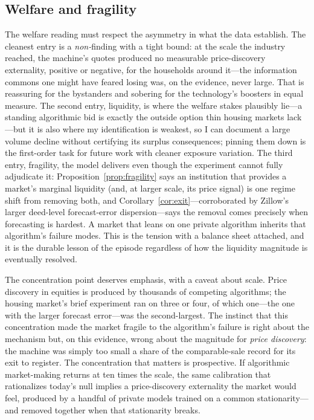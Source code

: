 \documentclass[12pt, letterpaper]{article}
\theoremstyle{remark}
\begin{document}
\subsection{Welfare and fragility}\label{sec:interp-welfare}

The welfare reading must respect the asymmetry in what the data establish. The cleanest entry is a \emph{non-}finding with a tight bound: at the scale the industry reached, the machine's quotes produced no measurable price-discovery externality, positive or negative, for the households around it---the information commons one might have feared losing was, on the evidence, never large. That is reassuring for the bystanders and sobering for the technology's boosters in equal measure. The second entry, liquidity, is where the welfare stakes plausibly lie---a standing algorithmic bid is exactly the outside option thin housing markets lack---but it is also where my identification is weakest, so I can document a large volume decline without certifying its surplus consequences; pinning them down is the first-order task for future work with cleaner exposure variation. The third entry, fragility, the model delivers even though the experiment cannot fully adjudicate it: Proposition~\ref{prop:fragility} says an institution that provides a market's marginal liquidity (and, at larger scale, its price signal) is one regime shift from removing both, and Corollary~\ref{cor:exit}---corroborated by Zillow's larger deed-level forecast-error dispersion---says the removal comes precisely when forecasting is hardest. A market that leans on one private algorithm inherits that algorithm's failure modes. This is the \citet{grossman1980impossibility} tension with a balance sheet attached, and it is the durable lesson of the episode regardless of how the liquidity magnitude is eventually resolved.

The concentration point deserves emphasis, with a caveat about scale. Price discovery in equities is produced by thousands of competing algorithms; the housing market's brief experiment ran on three or four, of which one---the one with the larger forecast error---was the second-largest. The instinct that this concentration made the market fragile to the algorithm's failure is right about the mechanism but, on this evidence, wrong about the magnitude for \emph{price discovery}: the machine was simply too small a share of the comparable-sale record for its exit to register. The concentration that matters is prospective. If algorithmic market-making returns at ten times the scale, the same calibration that rationalizes today's null implies a price-discovery externality the market would feel, produced by a handful of private models trained on a common stationarity---and removed together when that stationarity breaks.
\end{document}
